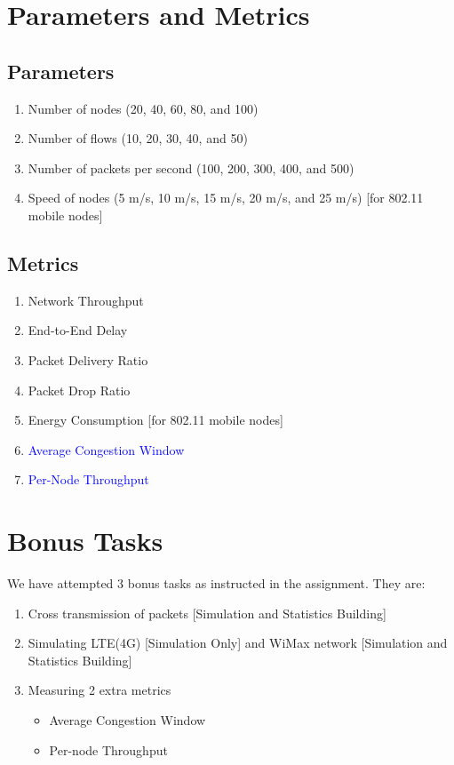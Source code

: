 \documentclass{article}[12pt]
\begin{document}
\section{Parameters and Metrics}
    \subsection{Parameters}
        \begin{enumerate}
            \item Number of nodes (20, 40, 60, 80, and 100)
            \item Number of flows  (10, 20, 30, 40, and 50)
            \item Number of packets per second  (100, 200, 300, 400, and 500)
            \item Speed of nodes (5 m/s, 10 m/s, 15 m/s, 20 m/s, and 25 m/s) [for 802.11 mobile nodes]
            
        \end{enumerate}

    \subsection{Metrics}
        \begin{enumerate}
            \item Network Throughput
            \item End-to-End Delay
            \item Packet Delivery Ratio 
            \item Packet Drop Ratio
            \item Energy Consumption [for 802.11 mobile nodes]
            \item \textcolor{blue}{Average Congestion Window}
            \item \textcolor{blue}{Per-Node Throughput}
        \end{enumerate}

\section{Bonus Tasks}
    We have attempted 3 bonus tasks as instructed in the assignment. They are: 
    \begin{enumerate}
        \item Cross transmission of packets [Simulation and Statistics Building]
        \item Simulating LTE(4G) [Simulation Only] and WiMax network [Simulation and Statistics Building]
        \item Measuring 2 extra metrics
            \begin{itemize}
                \item Average Congestion Window
                \item Per-node Throughput
            \end{itemize}
    \end{enumerate}
\end{document}
